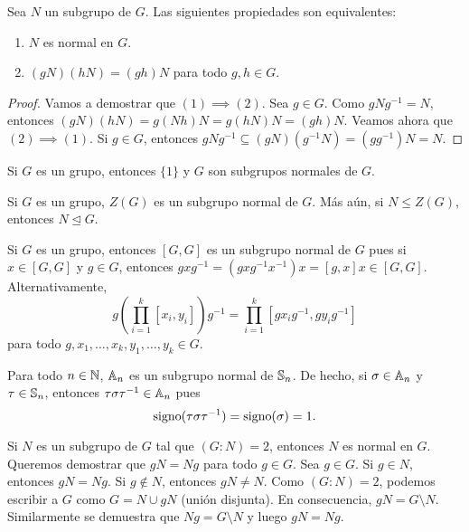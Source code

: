 \begin{proposition}
	Sea $N$ un subgrupo de $G$. Las siguientes propiedades son equivalentes:
	\begin{enumerate}
		\item $N$ es normal en $G$.
		\item $(gN)(hN)=(gh)N$ para todo $g,h\in G$.
	\end{enumerate}
\end{proposition}

\begin{proof}
	Vamos a demostrar que $(1)\implies(2)$. Sea $g\in G$. Como $gNg^{-1}=N$,
	entonces $(gN)(hN)=g(Nh)N=g(hN)N=(gh)N$. Veamos ahora que $(2)\implies(1)$. Si $g\in G$, entonces
	$gNg^{-1}\subseteq (gN)(g^{-1}N)=(gg^{-1})N=N$. 
\end{proof}

\begin{examples}
Si $G$ es un grupo, entonces 
$\{1\}$ y $G$ son subgrupos normales de $G$.
\end{examples}

\begin{example}
Si $G$ es un grupo, $Z(G)$ es un subgrupo normal de $G$. Más aún, si $N\leq Z(G)$, entonces $N\unlhd G$. 	
\end{example}

\begin{example}
Si $G$ es un grupo, entonces $[G,G]$ es un subgrupo normal de $G$ pues si $x\in [G,G]$ y $g\in G$, entonces 
$gxg^{-1}=(gxg^{-1}x^{-1})x=[g,x]x\in [G,G]$. Alternativamente, 
\[
g\left(\prod_{i=1}^k[x_i,y_i]\right)g^{-1}=\prod_{i=1}^k [gx_ig^{-1},gy_ig^{-1}]
\]
para todo $g,x_1,\dots,x_k,y_1,\dots,y_k\in G$. 	
\end{example}

\begin{example}
Para todo $n\in\mathbb{N}$, $\mathbb{A}_n$ es un subgrupo normal de $\mathbb{S}_n$. 
De hecho, si $\sigma\in\mathbb{A}_n$ y $\tau\in\mathbb{S}_n$, entonces $\tau\sigma\tau^{-1}\in\mathbb{A}_n$ pues  
\[
\operatorname{signo}(\tau\sigma\tau^{-1})=\operatorname{signo}(\sigma)=1. 
\]
\end{example}

\begin{example}
Si $N$ es un subgrupo de $G$ tal que $(G:N)=2$, entonces $N$ es normal en $G$. Queremos demostrar que $gN=Ng$ para todo $g\in G$. Sea $g\in G$. Si $g\in N$, entonces $gN=Ng$. Si $g\not\in N$, entonces
$gN\ne N$. Como $(G:N)=2$, podemos escribir a $G$ como $G=N\cup gN$ (unión disjunta). En consecuencia, $gN=G\setminus N$. Similarmente se demuestra que
$Ng=G\setminus N$ y luego $gN=Ng$. 	
\end{example}

